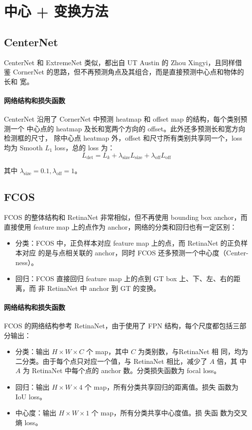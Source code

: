 \section{中心 + 变换方法}
\subsection{CenterNet}\label{sec:CenterNet}
CenterNet 和 ExtremeNet 类似，都出自 UT Austin 的 Zhou Xingyi，且同样借
鉴 CornerNet 的思路，但不再预测角点及其组合，而是直接预测中心点和物体的长和
宽。

\paragraph{网络结构和损失函数}
CenterNet 沿用了 CornerNet 中预测 heatmap 和 offset map 的结构，每个类别预测一个
中心点的 heatmap 及长和宽两个方向的 offset。此外还多预测长和宽方向检测框的尺寸，
除中心点 heatmap 外，offset 和尺寸所有类别共享同一个，loss 均为 Smooth $L_1$
loss，总的 loss 为：
\begin{equation}\label{equ:extreme-net-loss}
  L_{\det} = L_k + \lambda_{\mathrm{size}}L_{\mathrm{size}} + \lambda_{\mathrm{off}}L_{\mathrm{off}}
\end{equation}

其中 $\lambda_{\mathrm{size}}=0.1, \lambda_{\mathrm{off}}=1$。

\subsection{FCOS}\label{sec:FCOS}
FCOS 的整体结构和 RetinaNet 非常相似，但不再使用 bounding box anchor，而直接使用
feature map 上的点作为 anchor，网络的分类和回归也有一定区别：

\begin{itemize}
  \item 分类：FCOS 中，正负样本对应 feature map 上的点，而 RetinaNet 的正负样本对应
    的是与点相关联的 anchor，同时 FCOS 还多预测一个中心度（Center-ness）。
  \item 回归：FCOS 直接回归 feature map 上的点到 GT box 上、下、左、右的距离，而
    非 RetinaNet 中 anchor 到 GT 的变换。
\end{itemize}

\paragraph{网络结构和损失函数}
FCOS 的网络结构参考 RetinaNet，由于使用了 FPN 结构，每个尺度都包括三部分输出：
\begin{itemize}
  \item 分类：输出 $H \times W \times C$ 个 map，其中 $C$ 为类别数，与RetinaNet 相
    同，均为二分类。由于每个点只对应一个值，与 RetinaNet 相比，减少了 $A$ 倍，其
    中 $A$ 为 RetinaNet 中每个点的 anchor 数。分类损失函数为 focal loss。
  \item 回归：输出 $H \times W \times 4$ 个 map，所有分类共享回归的距离值。损失
    函数为 IoU loss。
  \item 中心度：输出 $H \times W \times 1$ 个 map，所有分类共享中心度值。损 失函
    数为交叉熵 loss。
\end{itemize}


